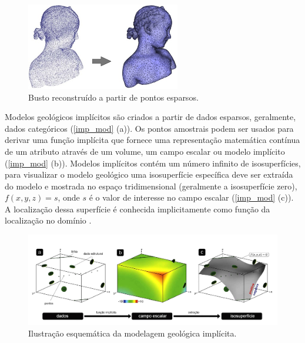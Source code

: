 \begin{figure}[!htb]
	\caption{\label{busto}Busto reconstruído a partir de pontos esparsos.} 
	\begin{center}
		\includegraphics[width=0.6\textwidth]{capitulo_1/busto}
	\end{center}
\end{figure}

Modelos geológicos implícitos são criados a partir de dados esparsos, geralmente, dados categóricos (\autoref{imp_mod} (a)). Os pontos amostrais podem ser usados para derivar uma função implícita que fornece uma representação matemática contínua de um atributo através de um volume, um campo escalar ou modelo implícito (\autoref{imp_mod} (b)). Modelos implícitos contém um número infinito de isosuperfícies, para visualizar o modelo geológico uma isosuperfície específica deve ser extraída do modelo e mostrada no espaço tridimensional (geralmente a isosuperfície zero), $f(x,y,z)=s$, onde $s$ é o valor de interesse no campo escalar (\autoref{imp_mod} (c)). A localização dessa superfície é conhecida implicitamente como função da localização no domínio \cite{martin2017implicitmodeling}. 

\begin{figure}[!htb]
	\caption{\label{imp_mod}Ilustração esquemática da modelagem geológica implícita.}
	\begin{center}
		\includegraphics[width=\textwidth]{capitulo_1/implicit_modelig_pt_1}
	\end{center}
\end{figure}

